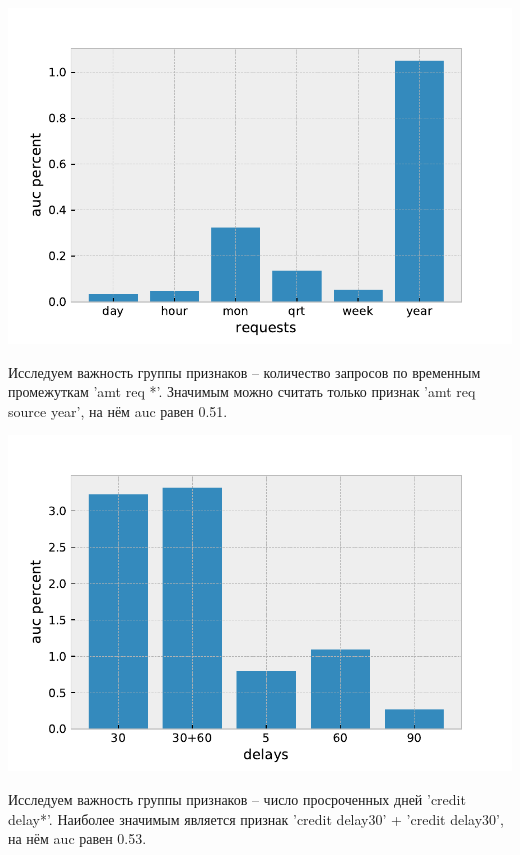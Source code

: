 \documentclass[russian, 10pt]{beamer}
\begin{document}
\begin{frame}

\includegraphics[scale=0.7]{images/requests.pdf}

Исследуем важность группы признаков -- количество запросов по временным промежуткам 'amt req *'. Значимым можно считать только признак 'amt req source year', на нём auc равен 0.51.

\end{frame}


\begin{frame}

\includegraphics[scale=0.7]{images/delays.pdf}

Исследуем важность группы признаков -- число просроченных дней 'credit delay*'. Наиболее значимым является признак 'credit delay30' + 'credit delay30', на нём auc равен 0.53.

\end{frame}
\end{document}
